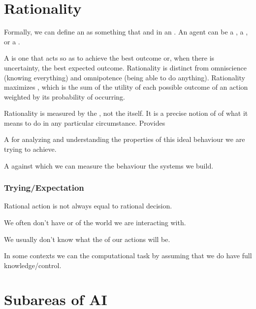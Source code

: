 \section{Rationality}

Formally, we can define an  as something that  and  in an . An agent can be a , a , or a .

A  is one that acts so as to achieve the best outcome or, when there is uncertainty, the best expected outcome. Rationality is distinct from omniscience (knowing everything) and omnipotence (being able to do anything). Rationality maximizes , which is the sum of the utility of each possible outcome of an action weighted by its probability of occurring. 

Rationality is measured by the , not the  itself. It is a precise  notion of of what it means to do  in any particular circumstance. Provides
\begin{listu}
    \item A  for analyzing and understanding the properties of this ideal behaviour we are trying to achieve.
    \item A  against which we can measure the behaviour the systems we build.
\end{listu}

\subsubsection{Trying/Expectation}

Rational action is not always equal to rational decision. 

\begin{listo}
    \item We often don't have  or  of the world we are interacting with.
    \item We usually don't know  what the  of our actions will be.
\end{listo}

In some contexts we can  the computational task by assuming that we do have full knowledge/control.

\section{Subareas of AI}

